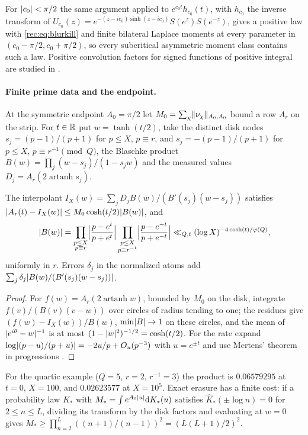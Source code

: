 For $\lvert c_0\rvert<\pi/2$ the same argument applied to $e^{c_0t}h_{c_0}(t)$, with $h_{c_0}$ the inverse transform of
$U_{c_0}(z)=e^{-(z-ic_0)\sinh(z-ic_0)}S(e^z)S(e^{-z})$, gives a positive law with \eqref{rec:eq:blurkill} and finite bilateral Laplace moments
at every parameter in $(c_0-\pi/2,c_0+\pi/2)$, so every subcritical asymmetric moment class contains such a law.
Positive convolution factors for signed functions of positive integral are studied in
\cite{RuzsaSzekely1983Convolution}.

\paragraph{Finite prime data and the endpoint.}
At the symmetric endpoint $A_0=\pi/2$ let $M_0=\sum_\chi\lVert\nu_\chi\rVert_{A_0,A_0}$ bound a row $A_r$ on the strip. For $t\in\mathbb{R}$ put $w=\tanh(t/2)$,
take the distinct disk nodes $s_j=(p-1)/(p+1)$ for $p\le X$, $p\equiv r$, and $s_j=-(p-1)/(p+1)$ for $p\le X$, $p\equiv r^{-1}\pmod Q$, the
Blaschke product $B(w)=\prod_j(w-s_j)/(1-s_jw)$ and the measured values $D_j=A_r(2\operatorname{artanh}s_j)$.

\begin{proposition}\label{rec:prop:blurdecode}
The interpolant $I_X(w)=\sum_jD_jB(w)/(B'(s_j)(w-s_j))$ satisfies $\lvert A_r(t)-I_X(w)\rvert\le M_0\cosh(t/2)\lvert B(w)\rvert$, and
\[
 \lvert B(w)\rvert=\prod_{\substack{p\le X\\p\equiv r}}\Bigl\lvert\frac{p-e^t}{p+e^t}\Bigr\rvert\prod_{\substack{p\le X\\p\equiv r^{-1}}}\Bigl\lvert\frac{p-e^{-t}}{p+e^{-t}}\Bigr\rvert\ll_{Q,t}(\log X)^{-4\cosh(t)/\varphi(Q)},
\]
uniformly in $r$. Errors $\delta_j$ in the normalized atoms add $\sum_j\delta_j\lvert B(w)/(B'(s_j)(w-s_j))\rvert$.
\end{proposition}

\begin{proof}
For $f(w)=A_r(2\operatorname{artanh}w)$, bounded by $M_0$ on the disk, integrate $f(v)/(B(v)(v-w))$ over circles of radius tending
to one; the residues give $(f(w)-I_X(w))/B(w)$, $\min\lvert B\rvert\to1$ on these circles, and the mean of $\lvert e^{i\theta}-w\rvert^{-1}$ is at
most $(1-\lvert w\rvert^2)^{-1/2}=\cosh(t/2)$. For the rate expand $\log\lvert(p-u)/(p+u)\rvert=-2u/p+O_u(p^{-3})$ with $u=e^{\pm t}$ and use
Mertens' theorem in progressions \cite{Williams1974Mertens}.
\end{proof}

For the quartic example ($Q=5$, $r=2$, $r^{-1}=3$) the product is $0.06579295$ at $t=0$, $X=100$, and $0.02623577$ at
$X=10^5$. Exact erasure has a finite cost: if a probability law $K_*$ with $M_*=\int e^{A_0\lvert u\rvert}\mathrm{d} K_*(u)$ satisfies
$\widehat K_*(\pm\log n)=0$ for $2\le n\le L$, dividing its transform by the disk factors and evaluating at $w=0$ gives
$M_*\ge\prod_{n=2}^L((n+1)/(n-1))^2=(L(L+1)/2)^2$.

